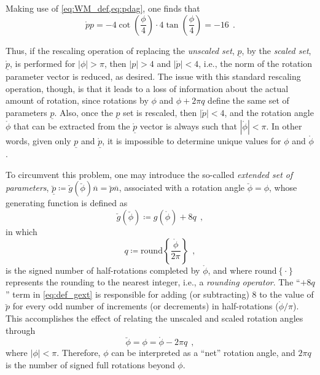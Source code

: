 \documentclass[12pt,a4paper,oneside,english]{abntex2} %
\newcommand{\vect}[1]{\underline{#1}}
\newcommand{\uvec}[1]{\overline{#1}}
\def\lp{\left(}
\def\rp{\right)}
\def\p{\vect{p}}
\def\phiscl{\mathring{\phi}}
\def\phiext{\breve{\phi}}
\def\pscaled{\mathring{\p}}
\def\pscalednorm{\mathring{p}}
\def\pext{\breve{\p}}
\def\pextnorm{\breve{p}}
\begin{document}
\begin{apendicesenv}
Making use of \cref{eq:WM_def,eq:pdag}, one finds that
\begin{equation}
    \pscalednorm p = -4\cot\lp\frac{\phi}{4}\rp \cdot 4\tan\lp\frac{\phi}{4}\rp = -16 \ \ .
    \label{eq:ppdagism16}
\end{equation}

Thus, if the rescaling operation of replacing the \textit{unscaled set}, $\p$, by the \textit{scaled set}, $\pscaled$, is performed for $|\phi| > \pi$, then $|p| > 4$ and  $|\pscalednorm| < 4$, i.e., the norm of the rotation parameter vector is reduced, as desired. The issue with this standard rescaling operation, though, is that it leads to a loss of information about the actual amount of rotation, since rotations by $\phi$ and $\phi + 2\pi q$ define the same set of parameters $\p$. Also, once the $\p$ set is rescaled, then $|\pscalednorm| < 4$, and the rotation angle $\phiscl$ that can be extracted from the $\pscaled$ vector is always such that $|\phiscl| < \pi$. In other words, given only $\p$ and $\pscaled$, it is impossible to determine unique values for $\phi$ and $\phiscl$. 

To circumvent this problem, one may introduce the so-called \textit{extended set of parameters}, $\pext \coloneqq \breve{g}(\phiext)\uvec{n} = \pextnorm\uvec{n}$, associated with a rotation angle $\phiext = \phi$, whose generating function is defined as
\begin{equation}
    \breve{g}(\phiext) \coloneqq g(\phiscl) + 8q \ \ ,
    \label{eq:def_gext}
\end{equation}
in which
\begin{equation}
    q \coloneqq \text{round}\left\{\frac{\phiscl}{2\pi}\right\} \ \ ,
    \label{eq:def_q}
\end{equation}
is the signed number of half-rotations completed by $\phiscl$, and where $\text{round}\left\{\cdot\right\}$ represents the rounding to the nearest integer, i.e., a \textit{rounding operator}. The ``$+8q$'' term in \cref{eq:def_gext} is responsible for adding (or subtracting) 8 to the value of $\pextnorm$ for every odd number of increments (or decrements) in half-rotations ($\phiscl/\pi$). This accomplishes the effect of relating the unscaled and scaled rotation angles through  
\begin{equation}
    \phiext = \phi = \phiscl - 2\pi q \ \ ,
    \label{eq:phi1}
\end{equation}
where $|\phi| < \pi$. Therefore,  $\phi$ can be interpreted as a ``net'' rotation angle, and $2\pi q$ is the number of signed full rotations beyond $\phi$.


\end{apendicesenv}
\end{document}
